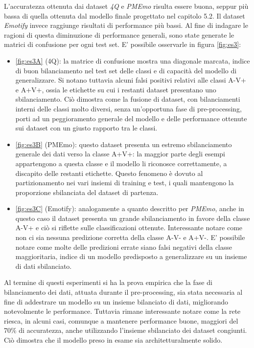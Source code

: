 \documentclass[11pt]{report}
\begin{document}
\vspace{1cm}

L'accuratezza ottenuta dai dataset \textit{4Q} e \textit{PMEmo} risulta essere buona, seppur più bassa di quella ottenuta dal modello finale progettato nel capitolo 5.2.  Il dataset \textit{Emotify} invece raggiunge risultati di performance più bassi. Al fine di indagare le ragioni di questa diminuzione di performance generali, sono state generate le matrici di confusione per ogni test set. E' possibile osservarle in figura \ref{fig:es3}:
\begin{itemize}
    \item \ref{fig:es3A} (4Q): la matrice di confusione mostra una diagonale marcata, indice di buon bilanciamento nel test set delle classi e di capacità del modello di generalizzare. Si notano tuttavia alcuni falsi positivi relativi alle classi A-V+ e A+V+, ossia le etichette su cui i restanti dataset presentano uno sbilanciamento. Ciò dimostra come la fusione di dataset, con bilanciamenti interni delle classi molto diversi, senza un'opportuna fase di pre-processing, porti ad un peggioramento generale del modello e delle performance ottenute sui dataset con un giusto rapporto tra le classi.
    
    \item \ref{fig:es3B} (PMEmo): questo dataset presenta un estremo sbilanciamento generale dei dati verso la classe A+V+: la maggior parte degli esempi appartengono a questa classe e il modello li riconosce correttamente, a discapito delle restanti etichette. Questo fenomeno è dovuto al partizionamento nei vari insiemi di training e test, i quali mantengono la proporzione sbilanciata del dataset di partenza.
    
    \item \ref{fig:es3C} (Emotify): analogamente a quanto descritto per \textit{PMEmo}, anche in questo caso il dataset presenta un grande sbilanciamento in favore della classe A-V+ e ciò si riflette sulle classificazioni ottenute. Interessante notare come non ci sia nessuna predizione corretta della classe A-V- e A+V-. E' possibile notare come molte delle predizioni errate siano falsi negativi della classe maggioritaria, indice di un modello predisposto a generalizzare su un insieme di dati sbilanciato.
\end{itemize}

Al termine di questi esperimenti si ha la prova empirica che la fase di bilanciamento dei dati, attuata durante il pre-processing, sia stata necessaria al fine di addestrare un modello su un insieme bilanciato di dati, migliorando notevolmente le performance. Tuttavia rimane interessante notare come la rete riesca, in alcuni casi, comunque a mantenere performance buone, maggiori del 70\% di accuratezza, anche utilizzando l'insieme sbilanciato dei dataset congiunti. Ciò dimostra che il modello preso in esame sia architetturalmente solido.
\end{document}
